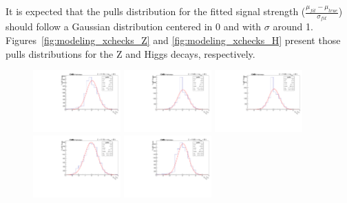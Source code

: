 It is expected that the pulls distribution for the fitted signal strength ($\frac{\mu_{fit} - \mu_{true}}{\sigma_{fit}}$) should follow a Gaussian distribution centered in 0 and with $\sigma$ around 1. Figures~\ref{fig:modeling_xchecks_Z} and \ref{fig:modeling_xchecks_H} present those pulls distributions for the Z and Higgs decays, respectively.






\begin{figure}[!htbp]
\begin{center}
 \includegraphics[width=0.3\textwidth]{figures/modeling_xchecks/plots/ZToUpsilon1SPhoton_Cat0_signalStrenght_20/pulls}
\includegraphics[width=0.3\textwidth]{figures/modeling_xchecks/plots/ZToUpsilon2SPhoton_Cat0_signalStrenght_20/pulls}
\includegraphics[width=0.3\textwidth]{figures/modeling_xchecks/plots/ZToUpsilon3SPhoton_Cat0_signalStrenght_20/pulls}
\includegraphics[width=0.3\textwidth]{figures/modeling_xchecks/plots/ZToUpsilon1SPhoton_Cat0_signalStrenght_50/pulls}
\includegraphics[width=0.3\textwidth]{figures/modeling_xchecks/plots/ZToUpsilon2SPhoton_Cat0_signalStrenght_50/pulls}

\end{center}
\end{figure}
